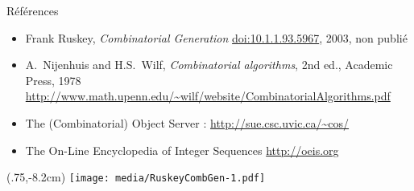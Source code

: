 \documentclass[12pt]{beamer}
\begin{document}
\begin{frame}{Références}

  \begin{itemize}
  \item Frank Ruskey, \textit{Combinatorial Generation}
    \url{doi:10.1.1.93.5967}, 2003, non publié
    \bigskip

  \item A.~Nijenhuis and H.S.~Wilf, \textit{Combinatorial algorithms}, 2nd
    ed., Academic Press, 1978\\
    \url{http://www.math.upenn.edu/~wilf/website/CombinatorialAlgorithms.pdf}
    \bigskip

  \item The (Combinatorial) Object Server : \url{http://sue.csc.uvic.ca/~cos/}
    \bigskip

  \item The On-Line Encyclopedia of Integer Sequences \url{http://oeis.org}
  \end{itemize}
  \begin{textblock*}{100mm}(.75\textwidth,-8.2cm)
    \texttt{[image: media/RuskeyCombGen-1.pdf]}
  \end{textblock*}
\end{frame}
\end{document}
